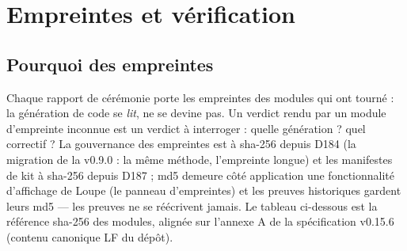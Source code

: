 \section{Empreintes et vérification}\label{sec:empreintslivre}

\subsection{Pourquoi des empreintes}

Chaque rapport de cérémonie porte les empreintes des modules qui ont tourné : la
génération de code se \emph{lit}, ne se devine pas. Un verdict rendu par un module
d'empreinte inconnue est un verdict à interroger : quelle génération ? quel correctif
? La gouvernance des empreintes est à sha-256 depuis D184 (la migration de la
v0.9.0 : la même méthode, l'empreinte longue) et les manifestes de kit à sha-256
depuis D187 ; md5 demeure côté application une fonctionnalité d'affichage de
Loupe (le panneau d'empreintes) et les preuves historiques gardent leurs md5 —
les preuves ne se réécrivent jamais. Le tableau ci-dessous est la référence
sha-256 des modules, alignée sur l'annexe A de la spécification v0.15.6
(contenu canonique LF du dépôt).

